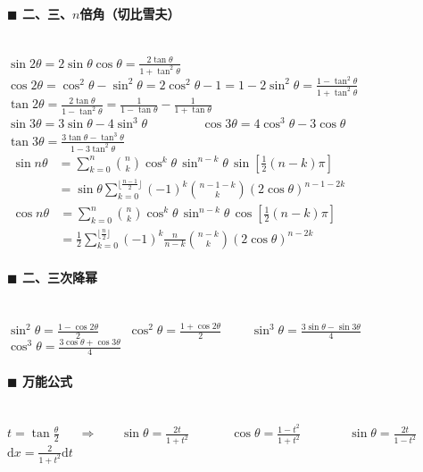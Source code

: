 \paragraph{$\blacksquare$ 二、三、$n$倍角（切比雪夫）}
\noindent \\
$\sin 2\theta =2\sin \theta \cos \theta =\frac{2\tan \theta}{1+\tan ^2 \theta}$\\
$\cos 2\theta =\cos ^2 \theta -\sin ^2 \theta =2\cos ^2 \theta -1=1-2\sin ^2 \theta=\frac{1-\tan ^2 \theta}{1+\tan ^2 \theta}$\\
$\tan 2\theta =\frac{2\tan \theta}{1-\tan ^2 \theta}=\frac{1}{1-\tan \theta}-\frac{1}{1+\tan \theta}$\\
$\sin 3\theta =3\sin \theta-4\sin ^3 \theta$~~~~~~~~
$\cos 3\theta=4\cos ^3 \theta-3\cos \theta$~~~~~~~~
$\tan 3\theta=\frac{3\tan \theta -\tan ^3 \theta}{1-3\tan ^2 \theta}$\\
$\begin{aligned} \sin n\theta &=\sum _{{k=0}}^{n}{\binom  {n}{k}}\cos ^{k}\theta \,\sin ^{{n-k}}\theta \,\sin \left[{\frac  {1}{2}}(n-k)\pi \right] \\&=\sin \theta \sum _{{k=0}}^{{\lfloor {\frac  {n-1}{2}}\rfloor }}(-1)^{k}{\binom  {n-1-k}{k}}(2\cos \theta )^{n-1-2k} \end{aligned}$\\
$\begin{aligned} \cos n\theta &=\sum _{{k=0}}^{n}{\binom  {n}{k}}\cos ^{k}\theta \,\sin ^{{n-k}}\theta \,\cos \left[{\frac  {1}{2}}(n-k)\pi \right] \\&={\frac  {1}{2}}\sum _{{k=0}}^{{\lfloor {\frac  {n}{2}}\rfloor }}(-1)^{k}{\frac  {n}{n-k}}{\binom  {n-k}{k}}(2\cos \theta )^{n-2k} \end{aligned}$\\
\paragraph{$\blacksquare$ 二、三次降幂}
\noindent \\
$\sin ^{2}\theta ={\frac  {1-\cos 2\theta }{2}}$~~~~
$\cos ^{2}\theta ={\frac  {1+\cos 2\theta }{2}}$~~~~
$\sin ^{3}\theta ={\frac  {3\sin \theta -\sin 3\theta }{4}}$~~~~
$\cos ^{3}\theta ={\frac  {3\cos \theta +\cos 3\theta }{4}}$\\
\paragraph{$\blacksquare$ 万能公式}
\noindent \\
$t=\tan \frac{\theta}{2}$~~~$\Rightarrow$~~~
$\sin \theta = \frac{2t}{1+t^2}$~~~~~~
$\cos \theta = \frac{1-t^2}{1+t^2}$~~~~~~~
$\sin \theta = \frac{2t}{1-t^2}$~~~~~~
$\mathrm{d}x=\frac{2}{1+t^2}\mathrm{d}t$\\
